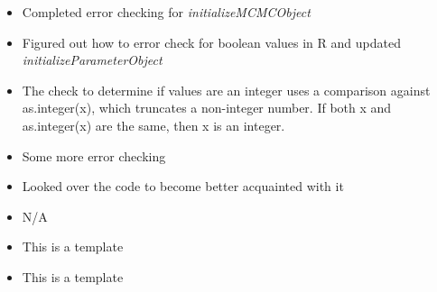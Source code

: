 \documentclass[12pt,hyperref]{labbook}
\begin{document}
\begin{itemize}
  \item Completed error checking for \textit{initializeMCMCObject}
  \item Figured out how to error check for boolean values in R and updated
\textit{initializeParameterObject} 
\end{itemize}
\begin{itemize}
  \item The check to determine if values are an integer uses a comparison
against as.integer(x), which truncates a non-integer number. If both x and 
as.integer(x) are the same, then x is an integer. 
\end{itemize}


\begin{itemize}
  \item Some more error checking
  \item Looked over the code to become better acquainted with it
\end{itemize}
\begin{itemize}
  \item N/A 
\end{itemize}






\begin{itemize}
  \item This is a template
\end{itemize}
\begin{itemize}
  \item This is a template
\end{itemize}


 
\end{document}
